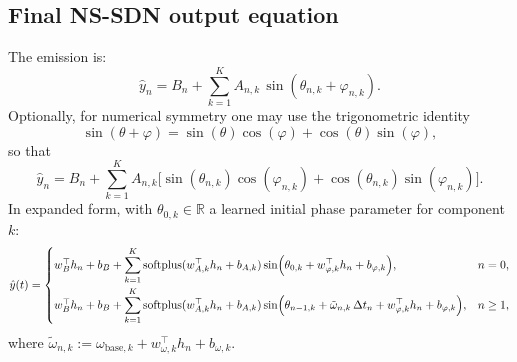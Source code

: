 \subsection{Final NS-SDN output equation}
The emission is:
\begin{equation}
\hat y_n = B_n + \sum_{k=1}^{K} A_{n,k}\,\sin(\theta_{n,k} + \varphi_{n,k}).
\label{eq:emission}
\end{equation}
Optionally, for numerical symmetry one may use the trigonometric identity
\begin{equation}
\sin(\theta + \varphi) = \sin(\theta)\cos(\varphi) + \cos(\theta)\sin(\varphi),
\end{equation}
so that
\begin{equation}
\hat y_n = B_n + \sum_{k=1}^{K} A_{n,k}\Big[\sin(\theta_{n,k})\cos(\varphi_{n,k}) + \cos(\theta_{n,k})\sin(\varphi_{n,k})\Big].
\end{equation}
In expanded form, with $\theta_{0,k} \in \mathbb{R}$ a learned initial phase parameter for component $k$:
\begin{equation}
\hat{y}(t) =
\begin{cases}
w_B^{\top} h_n + b_B
+ \displaystyle\sum_{k=1}^K
\operatorname{softplus}(w_{A,k}^{\top} h_n + b_{A,k})
\sin\!\Big(
\theta_{0,k}
+ w_{\varphi,k}^{\top} h_n + b_{\varphi,k}
\Big),
& n = 0, \\[1.2em]
w_B^{\top} h_n + b_B
+ \displaystyle\sum_{k=1}^K
\operatorname{softplus}(w_{A,k}^{\top} h_n + b_{A,k})
\sin\!\Big(
\theta_{n-1,k}
+ \tilde\omega_{n,k}\,\Delta t_n
+ w_{\varphi,k}^{\top} h_n + b_{\varphi,k}
\Big),
& n \ge 1,
\end{cases}
\end{equation}
where $\tilde\omega_{n,k} := \omega_{\mathrm{base},k} + w_{\omega,k}^{\top} h_n + b_{\omega,k}$.
